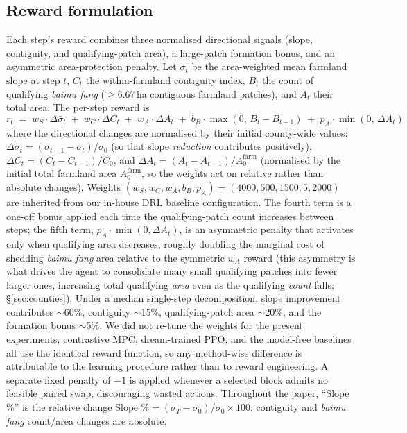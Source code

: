 \documentclass[11pt]{article}
\begin{document}
\subsection*{Reward formulation}\label{sec:methods-reward}

Each step's reward combines three normalised directional signals (slope, contiguity, and qualifying-patch area), a large-patch formation bonus, and an asymmetric area-protection penalty. Let $\bar{\sigma}_t$ be the area-weighted mean farmland slope at step $t$, $C_t$ the within-farmland contiguity index, $B_t$ the count of qualifying \textit{baimu fang} ($\geq$6.67\,ha contiguous farmland patches), and $A_t$ their total area. The per-step reward is
\begin{equation}
\label{eq:reward}
r_t \;=\; w_S \cdot \Delta \bar{\sigma}_t
       \;+\; w_C \cdot \Delta C_t
       \;+\; w_A \cdot \Delta A_t
       \;+\; b_B \cdot \max(0,\, B_t - B_{t-1})
       \;+\; p_A \cdot \min(0,\, \Delta A_t)
\end{equation}
where the directional changes are normalised by their initial county-wide values: $\Delta \bar{\sigma}_t = (\bar{\sigma}_{t-1} - \bar{\sigma}_t)/\bar{\sigma}_0$ (so that slope \emph{reduction} contributes positively), $\Delta C_t = (C_t - C_{t-1})/C_0$, and $\Delta A_t = (A_t - A_{t-1})/A_0^{\mathrm{farm}}$ (normalised by the initial total farmland area $A_0^{\mathrm{farm}}$, so the weights act on relative rather than absolute changes). Weights $(w_S, w_C, w_A, b_B, p_A) = (4000, 500, 1500, 5, 2000)$ are inherited from our in-house DRL baseline configuration. The fourth term is a one-off bonus applied each time the qualifying-patch count increases between steps; the fifth term, $p_A \cdot \min(0, \Delta A_t)$, is an asymmetric penalty that activates only when qualifying area decreases, roughly doubling the marginal cost of shedding \textit{baimu fang} area relative to the symmetric $w_A$ reward (this asymmetry is what drives the agent to consolidate many small qualifying patches into fewer larger ones, increasing total qualifying \emph{area} even as the qualifying \emph{count} falls; \S\ref{sec:counties}). Under a median single-step decomposition, slope improvement contributes $\sim$60\%, contiguity $\sim$15\%, qualifying-patch area $\sim$20\%, and the formation bonus $\sim$5\%. We did not re-tune the weights for the present experiments; contrastive MPC, dream-trained PPO, and the model-free baselines all use the identical reward function, so any method-wise difference is attributable to the learning procedure rather than to reward engineering. A separate fixed penalty of $-1$ is applied whenever a selected block admits no feasible paired swap, discouraging wasted actions. Throughout the paper, ``Slope \%'' is the relative change $\text{Slope \%} = (\bar{\sigma}_T - \bar{\sigma}_0)/\bar{\sigma}_0 \times 100$; contiguity and \textit{baimu fang} count/area changes are absolute.
\end{document}

